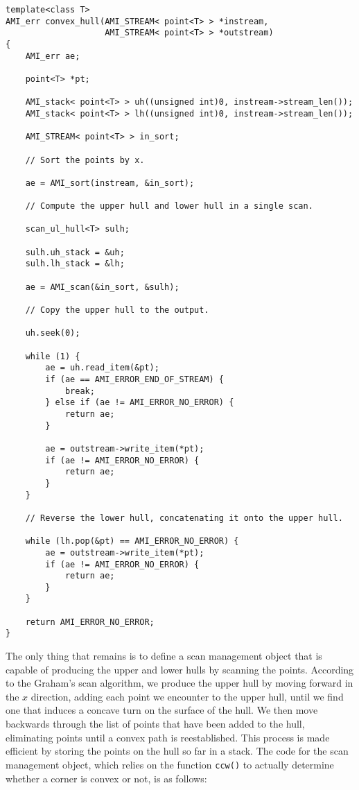 \begin{verbatim}
template<class T>
AMI_err convex_hull(AMI_STREAM< point<T> > *instream,
                    AMI_STREAM< point<T> > *outstream)
{
    AMI_err ae;

    point<T> *pt;

    AMI_stack< point<T> > uh((unsigned int)0, instream->stream_len());
    AMI_stack< point<T> > lh((unsigned int)0, instream->stream_len());

    AMI_STREAM< point<T> > in_sort;
        
    // Sort the points by x.

    ae = AMI_sort(instream, &in_sort);
    
    // Compute the upper hull and lower hull in a single scan.

    scan_ul_hull<T> sulh;

    sulh.uh_stack = &uh;
    sulh.lh_stack = &lh;
    
    ae = AMI_scan(&in_sort, &sulh);

    // Copy the upper hull to the output.

    uh.seek(0);
    
    while (1) {
        ae = uh.read_item(&pt);
        if (ae == AMI_ERROR_END_OF_STREAM) {
            break;
        } else if (ae != AMI_ERROR_NO_ERROR) {
            return ae;
        }

        ae = outstream->write_item(*pt);
        if (ae != AMI_ERROR_NO_ERROR) {
            return ae;
        }
    }
    
    // Reverse the lower hull, concatenating it onto the upper hull.

    while (lh.pop(&pt) == AMI_ERROR_NO_ERROR) {
        ae = outstream->write_item(*pt);
        if (ae != AMI_ERROR_NO_ERROR) {
            return ae;
        }
    }

    return AMI_ERROR_NO_ERROR;
}
\end{verbatim}

The only thing that remains is to define a scan management object that
is capable of producing the upper and lower hulls by scanning the
points.  According to the Graham's scan algorithm, we produce the
upper hull by moving forward in the $x$ direction, adding each
point we encounter to the upper hull, until we find one that induces a
concave turn on the surface of the hull.  We then move backwards
through the list of points that have been added to the hull,
eliminating points until a convex path is reestablished.  This process
is made efficient by storing the points on the hull so far in a stack.
The code for the scan management object, which relies on the function
\verb|ccw()| to actually determine whether a corner is
convex or not, is as follows:

